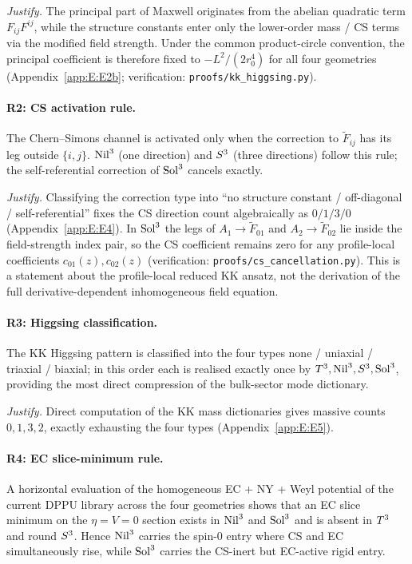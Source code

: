 \textit{Justify.}  The principal part of Maxwell originates from the abelian
quadratic term $F_{ij}F^{ij}$, while the structure constants enter only the
lower-order mass / CS terms via the modified field strength.  Under the
common product-circle convention, the principal coefficient is therefore
fixed to $-L^2/(2r_0^4)$ for all four geometries (Appendix~\ref{app:E:E2b};
verification: \texttt{proofs/kk\_higgsing.py}).

\paragraph{R2: CS activation rule.}
The Chern--Simons channel is activated only when the correction to
$\tilde{F}_{ij}$ has its leg outside $\{i,j\}$.  $\mathrm{Nil}^3$ (one direction)
and $S^3$ (three directions) follow this rule; the self-referential
correction of $\mathrm{Sol}^3$ cancels exactly.

\textit{Justify.}  Classifying the correction type into ``no structure
constant / off-diagonal / self-referential'' fixes the CS direction count
algebraically as $0/1/3/0$ (Appendix~\ref{app:E:E4}).  In $\mathrm{Sol}^3$ the
legs of $A_1\to\tilde{F}_{01}$ and $A_2\to\tilde{F}_{02}$ lie inside the
field-strength index pair, so the CS coefficient remains zero for any
profile-local coefficients $c_{01}(z), c_{02}(z)$ (verification:
\texttt{proofs/cs\_cancellation.py}).  This is a statement about the
profile-local reduced KK ansatz, not the derivation of the full
derivative-dependent inhomogeneous field equation.

\paragraph{R3: Higgsing classification.}
The KK Higgsing pattern is classified into the four types
none / uniaxial / triaxial / biaxial; in this order each is realised exactly
once by $T^3, \mathrm{Nil}^3, S^3, \mathrm{Sol}^3$, providing the most direct
compression of the bulk-sector mode dictionary.

\textit{Justify.}  Direct computation of the KK mass dictionaries gives
massive counts $0, 1, 3, 2$, exactly exhausting the four types
(Appendix~\ref{app:E:E5}).

\paragraph{R4: EC slice-minimum rule.}
A horizontal evaluation of the homogeneous EC + NY + Weyl potential of the
current DPPU library across the four geometries shows that an EC slice
minimum on the $\eta=V=0$ section exists in $\mathrm{Nil}^3$ and $\mathrm{Sol}^3$ and
is absent in $T^3$ and round $S^3$.  Hence $\mathrm{Nil}^3$ carries the
spin-0 entry where CS and EC simultaneously rise, while $\mathrm{Sol}^3$ carries
the CS-inert but EC-active rigid entry.

